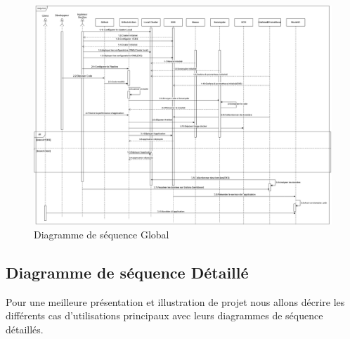             \begin{landscape}
              \begin{figure}[htbp]
                \centering
                \includegraphics[width=24cm]{Squence.drawio.png} %
                \caption{Diagramme de séquence Global}
              
              \end{figure}
            \end{landscape}
            \subsection{\selectfont\Large Diagramme de séquence Détaillé}
            Pour une meilleure présentation et illustration de projet nous allons décrire les différents cas d'utilisations principaux avec leurs diagrammes de séquence détaillés.
